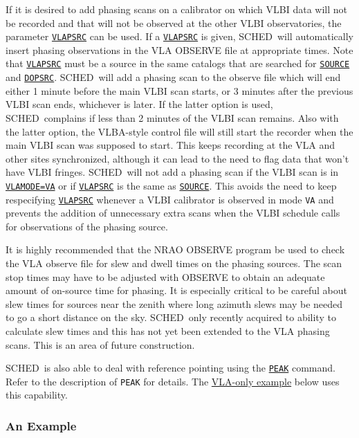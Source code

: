 \documentclass{report}
\newcommand{\schedb}{{\sc SCHED~}}
\begin{document}
If it is desired to add phasing scans on a calibrator on which VLBI
data will not be recorded and that will not be observed at the other
VLBI observatories, the parameter 
{\hyperref[MP:VLAPSRC]{{\tt VLAPSRC}}}
can be used.  If a 
{\hyperref[MP:VLAPSRC]{{\tt VLAPSRC}}} is given,
\schedb will automatically insert phasing observations in the VLA
OBSERVE file at appropriate times.  Note that 
{\hyperref[MP:VLAPSRC]{{\tt VLAPSRC}}}
must be a source in the same catalogs that are searched for 
{\hyperref[MP:SOURCE]{{\tt SOURCE}}} and 
{\hyperref[MP:DOPSRC]{{\tt DOPSRC}}}.
\schedb will add a phasing scan to the observe
file which will end either 1 minute before the main VLBI scan starts,
or 3 minutes after the previous VLBI scan ends, whichever is later.
If the latter option is used, \schedb complains if less than 2 minutes
of the VLBI scan remains.  Also with the latter option, the VLBA-style
control file will still start the recorder when the main VLBI scan
was supposed to start. This keeps recording at the VLA and other
sites synchronized, although it can lead to the need to flag data that
won't have VLBI fringes. \schedb will not add a phasing scan if the
VLBI scan is in 
{\hyperref[MP:VLAMODE]{{\tt VLAMODE=VA}}} or if
{\hyperref[MP:VLAPSRC]{{\tt VLAPSRC}}} is the same as 
{\hyperref[MP:SOURCE]{{\tt SOURCE}}}.
This avoids the need to keep respecifying
{\hyperref[MP:VLAPSRC]{{\tt VLAPSRC}}} whenever a VLBI calibrator is
observed in mode {\tt VA} and prevents the addition of unnecessary
extra scans when the VLBI schedule calls for observations of the
phasing source.

It is highly recommended that the NRAO {\sc OBSERVE} program be used
to check the VLA observe file for slew and dwell times on the phasing
sources. The scan stop times may have to be adjusted with {\sc
OBSERVE} to obtain an adequate amount of on-source time for phasing.
It is especially critical to be careful about slew times for sources
near the zenith where long azimuth slews may be needed to go a short
distance on the sky.  \schedb only recently acquired to ability to
calculate slew times and this has not yet been extended to the VLA
phasing scans.  This is an area of future construction.

\schedb is also able to deal with reference pointing using the
{\hyperref[MP:PEAK]{{\tt PEAK}}} command.  Refer to the description
of {\tt PEAK} for details.  The 
{\hyperref[SSEC:VLAONLY]{VLA-only example}}
below uses this capability.

\subsubsection{\label{SSSEC:VLBIEG}An Example}
\end{document}
